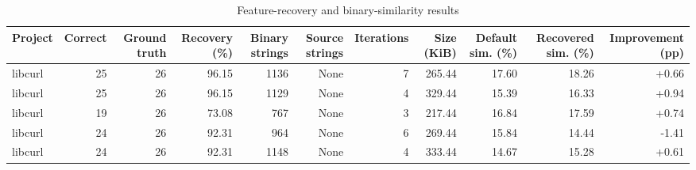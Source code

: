 \begin{table}[htbp]
\centering
\caption{Feature-recovery and binary-similarity results}
\label{tab:feature-recovery-results}
\small
\begin{tabular}{lrrrrrrrrrr}
\toprule
Project & Correct & Ground truth & Recovery (\%) & Binary strings & Source strings & Iterations & Size (KiB) & Default sim. (\%) & Recovered sim. (\%) & Improvement (pp) \\
\midrule
libcurl & 25 & 26 & 96.15 & 1136 & None & 7 & 265.44 & 17.60 & 18.26 & +0.66 \\
libcurl & 25 & 26 & 96.15 & 1129 & None & 4 & 329.44 & 15.39 & 16.33 & +0.94 \\
libcurl & 19 & 26 & 73.08 & 767 & None & 3 & 217.44 & 16.84 & 17.59 & +0.74 \\
libcurl & 24 & 26 & 92.31 & 964 & None & 6 & 269.44 & 15.84 & 14.44 & -1.41 \\
libcurl & 24 & 26 & 92.31 & 1148 & None & 4 & 333.44 & 14.67 & 15.28 & +0.61 \\
\bottomrule
\end{tabular}
\end{table}
